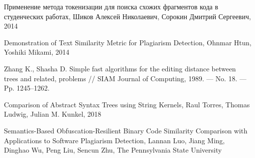 \begin{thebibliography}{}
	
	Применение метода токенизации для поиска схожих фрагментов кода в студенческих работах,
	Шиков Алексей Николаевич, Сорокин Дмитрий Сергеевич,
	2014
	
	Demonstration of Text Similarity Metric for Plagiarism Detection,
	Ohnmar Htun, Yoshiki Mikami,
	2014
	

	Zhang K., Shasha D. Simple fast algorithms for the editing distance between trees and related,
	problems // SIAM Journal of Computing, 1989. — No. 18. — Pp. 1245–1262.
	
	Comparison of Abstract Syntax Trees using String Kernels,
	Raul Torres, Thomas Ludwig, Julian M. Kunkel,
	2018

	Semantics-Based Obfuscation-Resilient Binary Code
	Similarity Comparison with Applications to Software
	Plagiarism Detection,
	Lannan Luo, Jiang Ming, Dinghao Wu, Peng Liu, Sencun Zhu,
	The Pennsylvania State University
	
	
\end{thebibliography}
\endgroup

\pagebreak